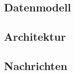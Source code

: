 

\subsection{Datenmodell}\label{sec:dat_model}


\subsection{Architektur}\label{sec:architecture}


\subsection{Nachrichten}\label{sec:messages}

